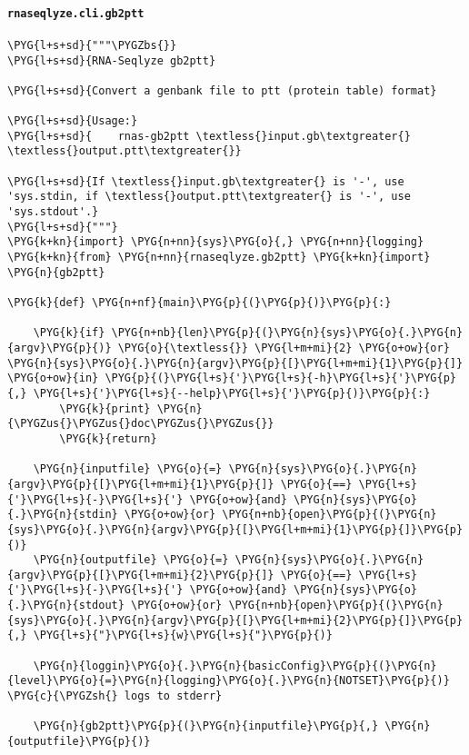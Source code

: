 \paragraph{\texttt{rnaseqlyze.cli.gb2ptt}}
\label{index-pdf4:rnaseqlyze-cli-gb2ptt}
\begin{Verbatim}[commandchars=\\\{\}]
\PYG{l+s+sd}{"""\PYGZbs{}}
\PYG{l+s+sd}{RNA-Seqlyze gb2ptt}

\PYG{l+s+sd}{Convert a genbank file to ptt (protein table) format}

\PYG{l+s+sd}{Usage:}
\PYG{l+s+sd}{    rnas-gb2ptt \textless{}input.gb\textgreater{} \textless{}output.ptt\textgreater{}}

\PYG{l+s+sd}{If \textless{}input.gb\textgreater{} is '-', use 'sys.stdin, if \textless{}output.ptt\textgreater{} is '-', use 'sys.stdout'.}
\PYG{l+s+sd}{"""}
\PYG{k+kn}{import} \PYG{n+nn}{sys}\PYG{o}{,} \PYG{n+nn}{logging}
\PYG{k+kn}{from} \PYG{n+nn}{rnaseqlyze.gb2ptt} \PYG{k+kn}{import} \PYG{n}{gb2ptt}

\PYG{k}{def} \PYG{n+nf}{main}\PYG{p}{(}\PYG{p}{)}\PYG{p}{:}

    \PYG{k}{if} \PYG{n+nb}{len}\PYG{p}{(}\PYG{n}{sys}\PYG{o}{.}\PYG{n}{argv}\PYG{p}{)} \PYG{o}{\textless{}} \PYG{l+m+mi}{2} \PYG{o+ow}{or} \PYG{n}{sys}\PYG{o}{.}\PYG{n}{argv}\PYG{p}{[}\PYG{l+m+mi}{1}\PYG{p}{]} \PYG{o+ow}{in} \PYG{p}{(}\PYG{l+s}{'}\PYG{l+s}{-h}\PYG{l+s}{'}\PYG{p}{,} \PYG{l+s}{'}\PYG{l+s}{--help}\PYG{l+s}{'}\PYG{p}{)}\PYG{p}{:}
        \PYG{k}{print} \PYG{n}{\PYGZus{}\PYGZus{}doc\PYGZus{}\PYGZus{}}
        \PYG{k}{return}

    \PYG{n}{inputfile} \PYG{o}{=} \PYG{n}{sys}\PYG{o}{.}\PYG{n}{argv}\PYG{p}{[}\PYG{l+m+mi}{1}\PYG{p}{]} \PYG{o}{==} \PYG{l+s}{'}\PYG{l+s}{-}\PYG{l+s}{'} \PYG{o+ow}{and} \PYG{n}{sys}\PYG{o}{.}\PYG{n}{stdin} \PYG{o+ow}{or} \PYG{n+nb}{open}\PYG{p}{(}\PYG{n}{sys}\PYG{o}{.}\PYG{n}{argv}\PYG{p}{[}\PYG{l+m+mi}{1}\PYG{p}{]}\PYG{p}{)}
    \PYG{n}{outputfile} \PYG{o}{=} \PYG{n}{sys}\PYG{o}{.}\PYG{n}{argv}\PYG{p}{[}\PYG{l+m+mi}{2}\PYG{p}{]} \PYG{o}{==} \PYG{l+s}{'}\PYG{l+s}{-}\PYG{l+s}{'} \PYG{o+ow}{and} \PYG{n}{sys}\PYG{o}{.}\PYG{n}{stdout} \PYG{o+ow}{or} \PYG{n+nb}{open}\PYG{p}{(}\PYG{n}{sys}\PYG{o}{.}\PYG{n}{argv}\PYG{p}{[}\PYG{l+m+mi}{2}\PYG{p}{]}\PYG{p}{,} \PYG{l+s}{"}\PYG{l+s}{w}\PYG{l+s}{"}\PYG{p}{)}

    \PYG{n}{loggin}\PYG{o}{.}\PYG{n}{basicConfig}\PYG{p}{(}\PYG{n}{level}\PYG{o}{=}\PYG{n}{logging}\PYG{o}{.}\PYG{n}{NOTSET}\PYG{p}{)} \PYG{c}{\PYGZsh{} logs to stderr}

    \PYG{n}{gb2ptt}\PYG{p}{(}\PYG{n}{inputfile}\PYG{p}{,} \PYG{n}{outputfile}\PYG{p}{)}
\end{Verbatim}


